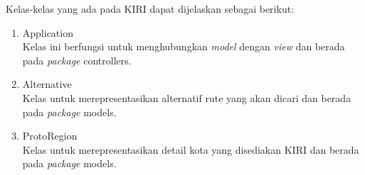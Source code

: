 Kelas-kelas yang ada pada KIRI dapat dijelaskan sebagai berikut:

\begin{enumerate}
	\item Application\\
			Kelas ini berfungsi untuk menghubungkan \textit{model} dengan \textit{view} dan berada pada \textit{package} controllers.
	\item Alternative\\
			Kelas untuk merepresentasikan alternatif rute yang akan dicari dan berada pada \textit{package} models.
	\item ProtoRegion\\
			Kelas untuk merepresentasikan detail kota yang disediakan KIRI dan berada pada \textit{package} models.
\end{enumerate}
